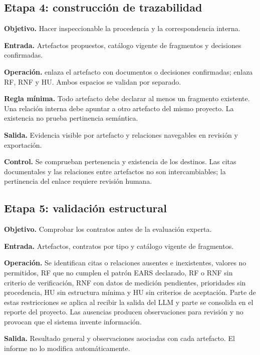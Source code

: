 \subsection{Etapa 4: construcción de trazabilidad}

\textbf{Objetivo.} Hacer inspeccionable la procedencia y la correspondencia interna.

\textbf{Entrada.} Artefactos propuestos, catálogo vigente de fragmentos y decisiones confirmadas.

\textbf{Operación.}  enlaza el artefacto con documentos o decisiones confirmadas;  enlaza RF, RNF y HU. Ambos espacios se validan por separado.

\textbf{Regla mínima.} Todo artefacto debe declarar al menos un fragmento existente. Una relación interna debe apuntar a otro artefacto del mismo proyecto. La existencia no prueba pertinencia semántica.

\textbf{Salida.} Evidencia visible por artefacto y relaciones navegables en revisión y exportación.

\textbf{Control.} Se comprueban pertenencia y existencia de los destinos. Las citas documentales y las relaciones entre artefactos no son intercambiables; la pertinencia del enlace requiere revisión humana.

\subsection{Etapa 5: validación estructural}

\textbf{Objetivo.} Comprobar los contratos antes de la evaluación experta.

\textbf{Entrada.} Artefactos, contratos por tipo y catálogo vigente de fragmentos.

\textbf{Operación.} Se identifican citas o relaciones ausentes e inexistentes, valores no permitidos, RF que no cumplen el patrón EARS declarado, RF o RNF sin criterio de verificación, RNF con datos de medición pendientes, prioridades sin procedencia, HU sin estructura mínima y HU sin criterios de aceptación. Parte de estas restricciones se aplica al recibir la salida del LLM y parte se consolida en el reporte del proyecto. Las ausencias producen observaciones para revisión y no provocan que el sistema invente información.

\textbf{Salida.} Resultado general y observaciones asociadas con cada artefacto. El informe no lo modifica automáticamente.

